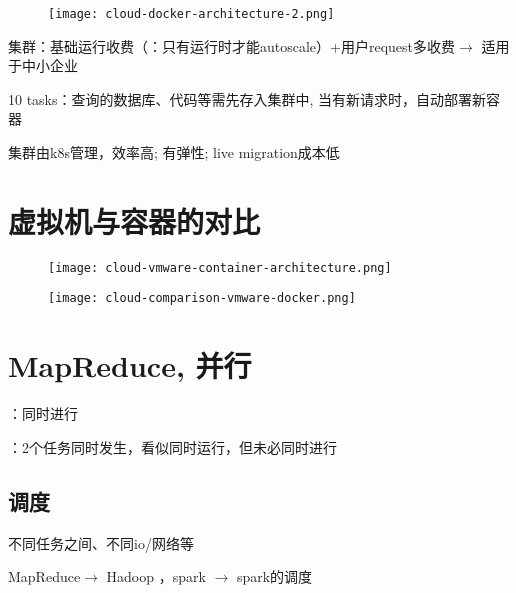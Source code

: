 \begin{figure}[htbp]
    \centering
    \texttt{[image: cloud-docker-architecture-2.png]}
\end{figure}

\begin{definition}[Cluster]

\end{definition}

集群：基础运行收费（：只有运行时才能autoscale）+用户request多收费$\rightarrow$ 适用于中小企业

\begin{example}
    10 tasks：查询的数据库、代码等需先存入️集群中, 
当有新请求时，️自动部署新容器
\end{example}

集群由k8s管理，效率高; 有弹性; live migration成本低

\section{虚拟机与容器的对比}


\begin{figure}[htbp]
    \texttt{[image: cloud-vmware-container-architecture.png]}
\end{figure}

\begin{figure}[htbp]
    \texttt{[image: cloud-comparison-vmware-docker.png]}
\end{figure}

\section{MapReduce, 并行}

：同时进行

：2个任务同时发生，看似同时运行，但未必同时进行

\subsection{调度}

不同任务之间、不同io/网络等

MapReduce$\rightarrow$ Hadoop ，spark $\rightarrow$ spark的调度